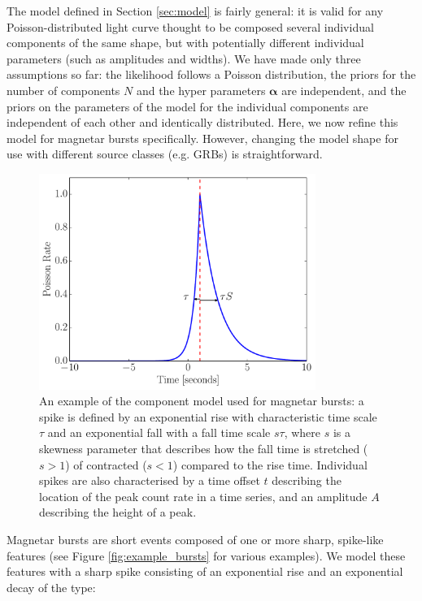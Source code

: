 \documentclass[12pt]{emulateapj}
\begin{document}
The model defined in Section \ref{sec:model} is fairly general: it is valid for any Poisson-distributed light curve thought to be composed several individual components of
the same shape, but with potentially different individual parameters (such as amplitudes and widths). 
We have made only three assumptions so far: the likelihood follows a Poisson distribution, the priors for the number of components $N$ and the hyper parameters $\bm{\alpha}$ are independent,
and the priors on the parameters of the model for the individual components are independent of each other and identically distributed. 
Here, we now refine this model for magnetar bursts specifically. However, changing the model shape for use with different source classes (e.g. GRBs) is straightforward.
\begin{figure}[h]
\begin{center}
\includegraphics[width=9cm]{word.pdf}
\caption{An example of the component model used for magnetar bursts: a spike is defined by an exponential rise with characteristic
time scale $\tau$ and an exponential fall with a fall time scale $s\tau$, where $s$ is a skewness parameter that describes how the fall
time is stretched ($s > 1$) of contracted ($s < 1$) compared to the rise time. Individual spikes are also characterised by a time offset
$t$ describing the location of the peak count rate in a time series, and an amplitude $A$ describing the height of a peak.}
\label{fig:word_example}
\end{center}
\end{figure}
Magnetar bursts are short events composed of one or more sharp, spike-like features (see Figure \ref{fig:example_bursts} for various examples). We model these features
with a sharp spike consisting of an exponential rise and an exponential decay of the type:
\end{document}
